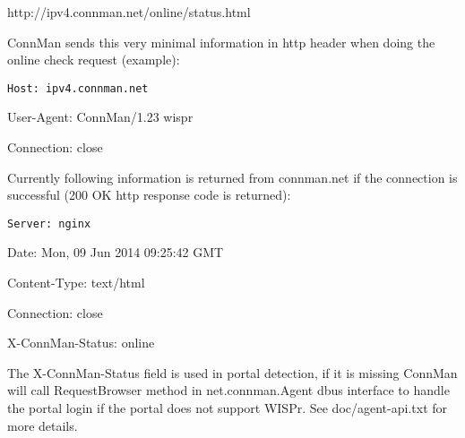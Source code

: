 
http://ipv4.connman.net/online/status.html

ConnMan sends this very minimal information in http header when doing
the online check request (example):

{\tt	Host: ipv4.connman.net

	User-Agent: ConnMan/1.23 wispr

	Connection: close}

Currently following information is returned from connman.net if
the connection is successful (200 OK http response code is returned):

{\tt	Server: nginx

	Date: Mon, 09 Jun 2014 09:25:42 GMT

	Content-Type: text/html

	Connection: close

	X-ConnMan-Status: online}

The X-ConnMan-Status field is used in portal detection, if it is missing
ConnMan will call RequestBrowser method in net.connman.Agent dbus
interface to handle the portal login if the portal does not support WISPr.
See doc/agent-api.txt for more details.

\bye
